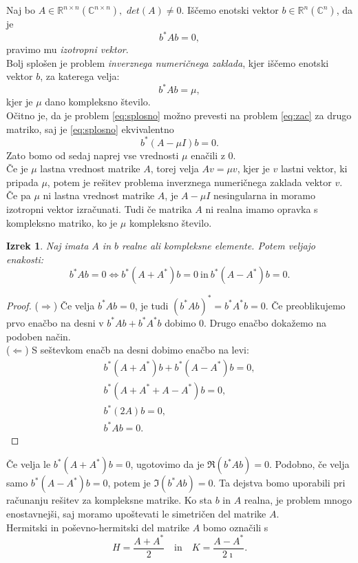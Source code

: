 \documentclass[12pt,a4paper]{amsart}
\theoremstyle{definition}
\theoremstyle{plain}
\newtheorem{izrek}[definicija]{Izrek}
\newcommand{\R}{\mathbb R}
\newcommand{\C}{\mathbb C}
\begin{document}
Naj bo $A\in\R^{n\times n} (\C^{n\times n}),$ $det(A)\ne 0$. Iščemo enotski vektor $b\in\R^{n} (\C^{n})$, da je
\begin{equation}\label{eq:zac}
b^\ast Ab=0,
\end{equation}
pravimo mu \emph{izotropni vektor}. \\
Bolj splošen je problem \emph{inverznega numeričnega zaklada}, kjer iščemo enotski vektor $b$, za katerega velja:
\begin{equation}\label{eq:splosno}
b^\ast Ab=\mu,
\end{equation}
kjer je $\mu$ dano kompleksno število.\\
Očitno je, da je problem \eqref{eq:splosno} možno prevesti na problem \eqref{eq:zac} za drugo matriko, saj je \eqref{eq:splosno} ekvivalentno
$$b^\ast (A-\mu I)b=0.$$
Zato bomo od sedaj naprej vse vrednosti $\mu$ enačili z $0$.\\
Če je $\mu$ lastna vrednost matrike $A$, torej velja $Av=\mu v$, kjer je $v$ lastni vektor, ki pripada $\mu$, potem je rešitev problema inverznega numeričnega zaklada vektor $v$. 
Če pa $\mu$ ni lastna vrednost matrike $A$, je $A-\mu I$ nesingularna in moramo izotropni vektor izračunati.
Tudi če matrika $A$ ni realna imamo opravka s kompleksno matriko, ko je $\mu$ kompleksno število. 
\begin{izrek}
Naj imata $A$ in $b$ realne ali kompleksne elemente. Potem veljajo enakosti:
$$b^\ast Ab=0\Leftrightarrow b^\ast (A+A^\ast)b=0 \ \textrm{in}\  b^\ast(A-A^\ast)b=0.$$
\end{izrek}
\begin{proof}
($\Rightarrow$) Če velja $b^\ast Ab=0$, je tudi $(b^\ast Ab)^\ast=b^\ast A^\ast b=0$. Če preoblikujemo prvo enačbo na desni v $b^\ast Ab +b^\ast A^\ast b$ dobimo 0. Drugo enačbo dokažemo na podoben način.\\
($\Leftarrow$) S seštevkom enačb na desni dobimo enačbo na levi:
\begin{align*}
 b^\ast (A+A^\ast)b+b^\ast(A-A^\ast)b=0,\\
b^\ast (A+A^\ast+A-A^\ast)b=0,\\
b^\ast (2A)b=0,\\
b^\ast Ab=0.
\end{align*}
\end{proof}

Če velja le $b^\ast (A+A^\ast)b=0$, ugotovimo da je $\Re(b^\ast Ab)=0$. Podobno, če velja samo $b^\ast(A-A^\ast)b=0$, potem je $\Im(b^\ast Ab)=0$. Ta dejstva bomo uporabili pri računanju rešitev za kompleksne matrike. 
Ko sta $b$ in $A$ realna, je problem mnogo enostavnejši, saj moramo upoštevati le simetričen del matrike $A$.\\
Hermitski in poševno-hermitski del matrike $A$ bomo označili s $$H=\frac{A+A^\ast}{2}\quad \text{in} \quad K=\frac{A-A^\ast}{2\imath}.$$
\end{document}
